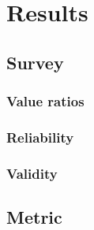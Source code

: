 \chapter{Results}

\section{Survey}

\subsection{Value ratios}

\subsection{Reliability}

\subsection{Validity}

\section{Metric}
